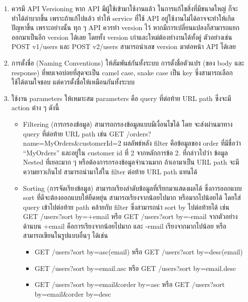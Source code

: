 \documentclass[14pt,oneside,openright,a4paper]{cpe-thai-project}
\begin{document}
\begin{enumerate}
        \item ควรมี API Versioning
              หาก API มีผู้ใช้เข้ามาใช้งานแล้ว ในการแก้ไขสิ่งที่มีขนาดใหญ่ ก็จะทำได้ลำบากขึ้น เพราะถ้าแก้ไปแล้ว ทำให้ service ที่ใช้ API อยู่ใช้งานไม่ได้อาจจะทำให้เกิดปัญหาขึ้น เพราะอย่างนั้น ทุก ๆ API ควรทำ version ไว้ หากมีการเปลี่ยนแปลงก็สามารถแยกออกมาเป็นอีก version ได้เลย โดยทั้ง version เก่าและใหม่ต้องทำงานได้ทั้งคู่ ตัวอย่างเช่น
              POST v1/users และ POST v2/users สามารถนำเลข version มาต่อหน้า API ได้เลย

        \item การตั้งชื่อ (Naming Conventions) ให้สัมพันธ์กันทั้งระบบ
              การตั้งชื่อตัวแปร (ของ body และ response) ที่พบเจอบ่อยที่สุดจะเป็น camel case, snake case เป็น key ซึ่งสามารถเลือกใช้ได้ตามใจชอบ แต่ควรตั้งชื่อให้เหมือนกันทั้งระบบ

        \item ใช้งาน parameters ให้เหมาะสม parameters คือ query ที่ต่อท้าย URL path ซึ่งจะมี action ต่าง ๆ ดังนี้
          \begin{itemize}
            \item Filtering (การกรองข้อมูล) สามารถกรองข้อมูลแบบมีเงื่อนไขได้ โดย จะส่งผ่านมาทาง query ที่ต่อท้าย URL path เช่น GET /orders?name=MyOrders\&customerId=2
                  ผลลัพธ์หลัง filter คือข้อมูลของ order ที่มีชื่อว่า “MyOrders” และอยู่ใน customer id ที่ 2 จากหลักการข้อ 2. ที่กล่าวไปว่า ข้อมูล Nested ที่เยอะมาก ๆ หรือต้องการกรองข้อมูลจำนวนมาก ถ้าเอามาเป็น URL path จะมีความยาวเกินไป สามารถนำมาใส่ใน filter ต่อท้าย URL path แทนได้
            \item Sorting (การจัดเรียงข้อมูล) สามารถเรียงลำดับข้อมูลที่เรียกมาแสดงผลได้ ซึ่งการออกแบบ sort ที่ดีจะต้องออกแบบให้ยืดหยุ่น สามารถเรียงจากน้อยไปมาก หรือมากไปน้อยได้ โดยใส่ query เข้าไปต่อท้าย path คล้ายกับ filter ซึ่งสามารถนำ sort by ไปต่อท้ายได้ เช่น
                  GET /users?sort by=+email หรือ GET /users?sort by=-email จากตัวอย่างด้านบน +email คือการเรียงจากน้อยไปมาก และ -email เรียงจากมากไปน้อย หรือสามารถเขียนในรูปแบบอื่นๆ ได้เช่น
                  \begin{itemize} 
                    \item GET /users?sort by=asc(email) หรือ GET /users?sort by=desc(email)
                    \item GET /users?sort by=email.asc หรือ GET /users?sort by=email.desc
                    \item GET /users?sort by=email\&order by=asc หรือ GET /users?sort by=email\&order by=desc
                  \end{itemize}


\end{itemize}
\end{enumerate}
\end{document}
